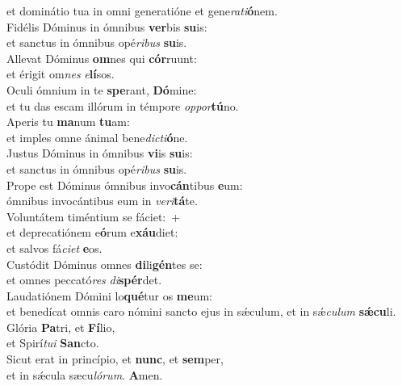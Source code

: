 \oddverse et dominátio tua in omni generatióne et gene\textit{ra}\textit{ti}\textbf{ó}nem.\\
\evenverse Fidélis Dóminus in ómnibus \textbf{ver}bis \textbf{su}is:~\*\\
\evenverse et sanctus in ómnibus opé\textit{ri}\textit{bus} \textbf{su}is.\\
\oddverse Allevat Dóminus \textbf{om}nes qui \textbf{cór}ruunt:~\*\\
\oddverse et érigit om\textit{nes} \textit{e}\textbf{lí}sos.\\
\evenverse Oculi ómnium in te \textbf{spe}rant, \textbf{Dó}mine:~\*\\
\evenverse et tu das escam illórum in témpore \textit{op}\textit{por}\textbf{tú}no.\\
\oddverse Aperis tu \textbf{ma}num \textbf{tu}am:~\*\\
\oddverse et imples omne ánimal bene\textit{di}\textit{cti}\textbf{ó}ne.\\
\evenverse Justus Dóminus in ómnibus \textbf{vi}is \textbf{su}is:~\*\\
\evenverse et sanctus in ómnibus opé\textit{ri}\textit{bus} \textbf{su}is.\\
\oddverse Prope est Dóminus ómnibus invo\textbf{cán}tibus \textbf{e}um:~\*\\
\oddverse ómnibus invocántibus eum in \textit{ve}\textit{ri}\textbf{tá}te.\\
\evenverse Voluntátem timéntium se fáciet:~+\\
\evenverse  et deprecatiónem e\textbf{ó}rum e\textbf{xáu}diet:~\*\\
\evenverse et salvos fá\textit{ci}\textit{et} \textbf{e}os.\\
\oddverse Custódit Dóminus omnes \textbf{di}li\textbf{gén}tes se:~\*\\
\oddverse et omnes peccató\textit{res} \textit{di}\textbf{spér}det.\\
\evenverse Laudatiónem Dómini lo\textbf{qué}tur os \textbf{me}um:~\*\\
\evenverse et benedícat omnis caro nómini sancto ejus in sǽculum, et in sǽ\textit{cu}\textit{lum} \textbf{sǽ}\textbf{cu}li.\\
\oddverse Glória \textbf{Pa}tri, et \textbf{Fí}lio,~\*\\
\oddverse et Spirí\textit{tu}\textit{i} \textbf{San}cto.\\
\evenverse Sicut erat in princípio, et \textbf{nunc}, et \textbf{sem}per,~\*\\
\evenverse et in sǽcula sæcu\textit{ló}\textit{rum}. \textbf{A}men.\\
